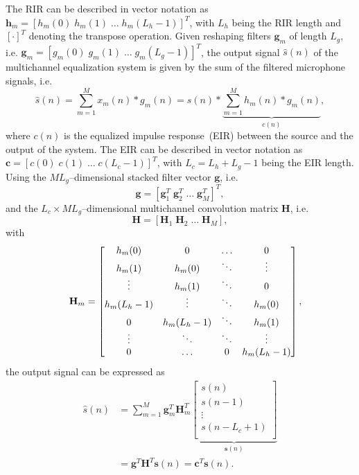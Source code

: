 \documentclass[10pt]{IEEEtran}
\begin{document}
The RIR can be described in vector notation as $\mathbf{h}_m = \left[h_m(0) \; h_m(1) \; \ldots \; h_m(L_h-1) \right]^T$, with $L_h$ being the RIR length and $\left[\cdot \right]^T$ denoting the transpose operation.
Given reshaping filters $\mathbf{g}_m$ of length $L_g$, i.e. $\mathbf{g}_m = \left[g_m(0) \; g_m(1) \; \ldots \; g_m(L_g-1) \right]^T$, the output signal $\hat{s}(n)$ of the multichannel equalization system is given by the sum of the filtered microphone signals, i.e.
\begin{equation}
  \hat{s}(n) = \sum_{m=1}^{M} x_m(n) \ast g_m(n) = s(n) \ast \underbrace{\sum_{m=1}^{M} h_m(n) \ast g_m(n)}_{c(n)},
\end{equation}
where $c(n)$ is the equalized impulse response~(EIR) between the source and the output of the system.
The EIR can be described in vector notation as $\mathbf{c} = \left[c(0) \; c(1) \; \ldots \; c(L_c-1) \right]^{T}$, with $L_c = L_h+L_g-1$ being the EIR length.
Using the $ML_g$--dimensional stacked filter vector $\mathbf{g}$, i.e.
\begin{equation}
  \mathbf{g}  =  \left[\mathbf{g}_1^T \; \mathbf{g}_2^T \; \ldots \; \mathbf{g}_M^T \right]^T,
\end{equation}
 and the $L_c \times ML_g$--dimensional multichannel convolution matrix $\mathbf{H}$, i.e.
\begin{equation}
\mathbf{H}  = \left[\mathbf{H}_1 \; \mathbf{H}_2 \; \ldots \; \mathbf{H}_M \right],
\end{equation}
with
\begin{equation}
\small
\mathbf{H}_m =  \begin{bmatrix}
    h_m(0) & 0 &  \ldots & 0 \\
    h_m(1) & h_m(0) & \ddots & \vdots \\
    \vdots & h_m(1) & \ddots & 0 \\
    h_m(L_h-1) & \vdots & \ddots & h_m(0) \\
    0 & h_m(L_h-1) & \ddots & h_m(1) \\
    \vdots & \ddots & \ddots & \vdots \\
    0 & \ldots & 0 & h_m(L_h-1)
   \end{bmatrix},\hspace{-0.4cm}
 \end{equation}
the output signal can be expressed as
\begin{align}
\hat{s}(n) &=  \sum_{m=1}^{M} \mathbf{g}_m^T
 \mathbf{H}_m^T
\underbrace{\left[
\begin{array}{c}
s(n) \\
s(n-1) \\
\vdots \\
s(n-L_c+1) \\
\end{array}
\right]}_{\mathbf{s}(n)}  \\
& =  \mathbf{g}^T \mathbf{H}^T \mathbf{s}(n)  =  \mathbf{c}^T \mathbf{s}(n).
\end{align}
\end{document}
